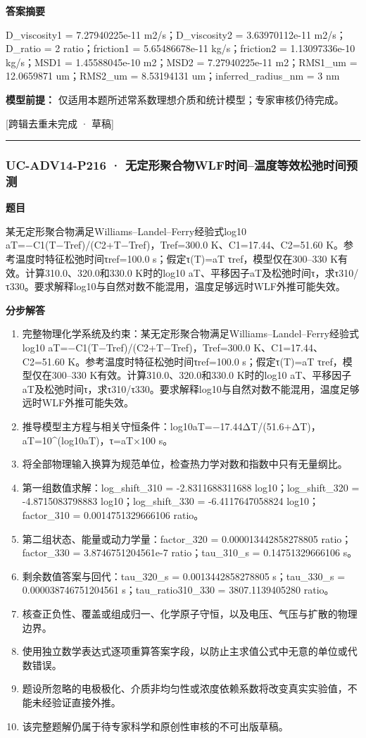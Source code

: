 \documentclass[UTF8,11pt,a4paper]{ctexart}
\begin{document}
\noindent\textbf{答案摘要}\par
D\_viscosity1 = 7.27940225e-11 m2/s；D\_viscosity2 = 3.63970112e-11 m2/s；D\_ratio = 2 ratio；friction1 = 5.65486678e-11 kg/s；friction2 = 1.13097336e-10 kg/s；MSD1 = 1.45588045e-10 m2；MSD2 = 7.27940225e-11 m2；RMS1\_um = 12.0659871 um；RMS2\_um = 8.53194131 um；inferred\_radius\_nm = 3 nm\par
\noindent\textbf{模型前提：}
仅适用本题所述常系数理想介质和统计模型；专家审核仍待完成。\par
\noindent\textcolor{red!65!black}{[跨辑去重未完成 · 草稿]} \par
\medskip\hrule\medskip
{}
\subsubsection*{UC-ADV14-P216 · 无定形聚合物WLF时间–温度等效松弛时间预测}
\noindent\textbf{题目}\par
某无定形聚合物满足Williams–Landel–Ferry经验式log10 aT=−C1(T−Tref)/(C2+T−Tref)，Tref=300.0 K、C1=17.44、C2=51.60 K。参考温度时特征松弛时间τref=100.0 s；假定τ(T)=aT τref，模型仅在300–330 K有效。计算310.0、320.0和330.0 K时的log10 aT、平移因子aT及松弛时间τ，求τ310/τ330。要求解释log10与自然对数不能混用，温度足够远时WLF外推可能失效。\par
\medskip\noindent\textbf{分步解答}
\begin{enumerate}
\item 完整物理化学系统及约束：某无定形聚合物满足Williams–Landel–Ferry经验式log10 aT=−C1(T−Tref)/(C2+T−Tref)，Tref=300.0 K、C1=17.44、C2=51.60 K。参考温度时特征松弛时间τref=100.0 s；假定τ(T)=aT τref，模型仅在300–330 K有效。计算310.0、320.0和330.0 K时的log10 aT、平移因子aT及松弛时间τ，求τ310/τ330。要求解释log10与自然对数不能混用，温度足够远时WLF外推可能失效。
\item 推导模型主方程与相关守恒条件：log10aT=−17.44ΔT/(51.6+ΔT)，aT=10\textasciicircum{}(log10aT)，τ=aT×100 s。
\item 将全部物理输入换算为规范单位，检查热力学对数和指数中只有无量纲比。
\item 第一组数值求解：log\_shift\_310 = -2.8311688311688 log10；log\_shift\_320 = -4.8715083798883 log10；log\_shift\_330 = -6.4117647058824 log10；factor\_310 = 0.0014751329666106 ratio。
\item 第二组状态、能量或动力学量：factor\_320 = 0.000013442858278805 ratio；factor\_330 = 3.8746751204561e-7 ratio；tau\_310\_s = 0.14751329666106 s。
\item 剩余数值答案与回代：tau\_320\_s = 0.0013442858278805 s；tau\_330\_s = 0.000038746751204561 s；tau\_ratio310\_330 = 3807.1139405280 ratio。
\item 核查正负性、覆盖或组成归一、化学原子守恒，以及电压、气压与扩散的物理边界。
\item 使用独立数学表达式逐项重算答案字段，以防止主求值公式中无意的单位或代数错误。
\item 题设所忽略的电极极化、介质非均匀性或浓度依赖系数将改变真实实验值，不能未经验证直接外推。
\item 该完整题解仍属于待专家科学和原创性审核的不可出版草稿。
\end{enumerate}
\end{document}
